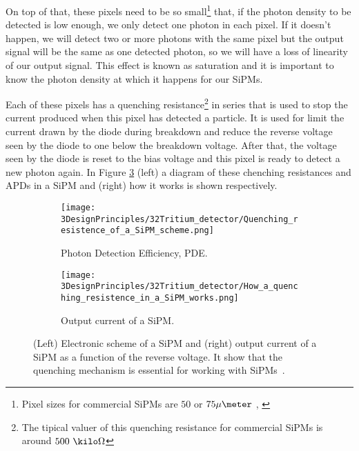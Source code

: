 On top of that, these pixels need to be so small\footnote{Pixel sizes for commercial SiPMs are $50$ or $75\mu\meter$ \cite{DataSheetHammamatsu_1_SiPM_50}, \cite{DataSheetHammamatsu_1_SiPM_75}} that, if the photon density to be detected is low enough, we only detect one photon in each pixel. If it doesn't happen, we will detect two or more photons with the same pixel but the output signal will be the same as one detected photon, so we will have a loss of linearity of our output signal. This effect is known as saturation and it is important to know the photon density at which it happens for our SiPMs. %

Each of these pixels has a quenching resistance\footnote{The tipical valuer of this quenching resistance for commercial SiPMs is around $500~\kilo\Omega$} in series that is used to stop the current produced when this pixel has detected a particle. It is used for limit the current drawn by the diode during breakdown and reduce the reverse voltage seen by the diode to one below the breakdown voltage. After that, the voltage seen by the diode is reset to the bias voltage and this pixel is ready to detect a new photon again. In Figure \ref{fig:ChenchingResistance} (left) a diagram of these chenching resistances and APDs in a SiPM and (right) how it works is shown respectively.

\begin{figure}
\centering
    \begin{subfigure}[b]{0.45\textwidth}
    \centering
    \texttt{[image: 3DesignPrinciples/32Tritium\_detector/Quenching\_resistence\_of\_a\_SiPM\_scheme.png]}  
    \caption{Photon Detection Efficiency, PDE.\label{subfig:ElectricModelSiPM}}
    \end{subfigure}
    \hfill
    \begin{subfigure}[b]{0.45\textwidth}
    \centering
    \texttt{[image: 3DesignPrinciples/32Tritium\_detector/How\_a\_quenching\_resistence\_in\_a\_SiPM\_works.png]}  
    \caption{Output current of a SiPM.\label{subfig:HowSiPMworks}}
    \end{subfigure}
 \caption{(Left) Electronic scheme of a SiPM and (right) output current of a SiPM as a function of the reverse voltage. It show that the quenching mechanism is essential for working with SiPMs~\cite{DataSheetSensL}.}
 \label{fig:ChenchingResistance}
\end{figure}

